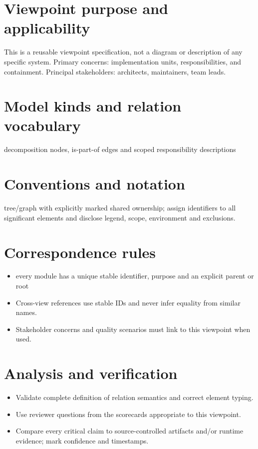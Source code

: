 \documentclass[10pt,letterpaper]{article}
\begin{document}
\DocProvenance
\section{Viewpoint purpose and applicability}
This is a reusable viewpoint specification, not a diagram or description of any specific system. Primary concerns: implementation units, responsibilities, and containment. Principal stakeholders: architects, maintainers, team leads.

\section{Model kinds and relation vocabulary}
decomposition nodes, is-part-of edges and scoped responsibility descriptions

\section{Conventions and notation}
tree/graph with explicitly marked shared ownership; assign identifiers to all significant elements and disclose legend, scope, environment and exclusions.

\section{Correspondence rules}
\begin{itemize}
\item every module has a unique stable identifier, purpose and an explicit parent or root
\item Cross-view references use stable IDs and never infer equality from similar names.
\item Stakeholder concerns and quality scenarios must link to this viewpoint when used.
\end{itemize}
\section{Analysis and verification}
\begin{itemize}
\item Validate complete definition of relation semantics and correct element typing.
\item Use reviewer questions from the scorecards appropriate to this viewpoint.
\item Compare every critical claim to source-controlled artifacts and/or runtime evidence; mark confidence and timestamps.
\end{itemize}
\end{document}
